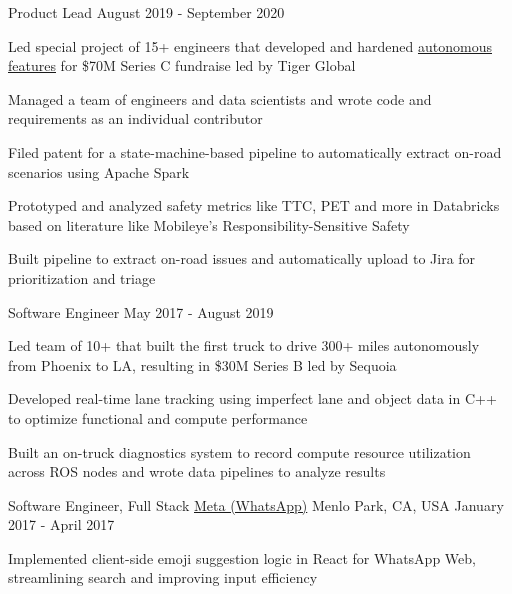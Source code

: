 \begin{center}
  \cvsubentry
    {Product Lead}
    {August 2019 - September 2020}
    {
      \begin{cvitems}
        \item {Led special project of 15+ engineers that developed and hardened \href{https://www.youtube.com/watch?v=llAQyawBau0}{\underline{autonomous features}} for \$70M Series C fundraise led by Tiger Global}
        \item {Managed a team of engineers and data scientists and wrote code and requirements as an individual contributor}
        \item {Filed patent for a state-machine-based pipeline to automatically extract on-road scenarios using Apache Spark}
        \item {Prototyped and analyzed safety metrics like TTC, PET and more in Databricks based on literature like Mobileye's Responsibility-Sensitive Safety}
        \item {Built pipeline to extract on-road issues and automatically upload to Jira for prioritization and triage}
      \end{cvitems} 
    }
\end{center}
\begin{center}
  \cvsubentry
    {Software Engineer}
    {May 2017 - August 2019}
    {
      \begin{cvitems}
        \item {Led team of 10+ that built the first truck to drive 300+ miles autonomously from Phoenix to LA, resulting in \$30M Series B led by Sequoia}
        \item {Developed real-time lane tracking using imperfect lane and object data in C++ to optimize functional and compute performance}
        \item {Built an on-truck diagnostics system to record compute resource utilization across ROS nodes and wrote data pipelines to analyze results}
      \end{cvitems} 
    }
\end{center}
\begin{center}
  \vspace{-3.4mm}
  \cventry
    {Software Engineer, Full Stack}
    {\href{https://web.whatsapp.com/}{Meta (WhatsApp)}}
    {Menlo Park, CA, USA}
    {January 2017 - April 2017}
    {
      \begin{cvitems}
        \item {Implemented client-side emoji suggestion logic in React for WhatsApp Web, streamlining search and improving input efficiency}
      \end{cvitems}
    }
\end{center}
